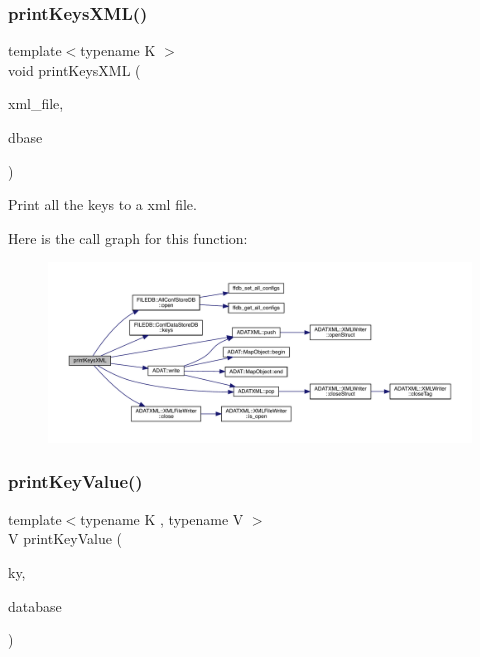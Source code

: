 \subsubsection{\texorpdfstring{printKeysXML()}{printKeysXML()}}
{\footnotesize\ttfamily template$<$typename K $>$ \\
void print\+Keys\+X\+ML (\begin{DoxyParamCaption}\item[{const string \&}]{xml\+\_\+file,  }\item[{const string \&}]{dbase }\end{DoxyParamCaption})}



Print all the keys to a xml file. 

Here is the call graph for this function\+:
\nopagebreak
\begin{figure}[H]
\begin{center}
\leavevmode
\includegraphics[width=350pt]{d4/d74/adat-devel_2main_2dbutil_2dbgraph__convert_8cc_a44428d59560cb466420c5c0ca60315e5_cgraph}
\end{center}
\end{figure}
\mbox{\label{adat-devel_2main_2dbutil_2dbgraph__convert_8cc_a1c5a310406bc62a92190de39689f1005}} 
\subsubsection{\texorpdfstring{printKeyValue()}{printKeyValue()}}
{\footnotesize\ttfamily template$<$typename K , typename V $>$ \\
V print\+Key\+Value (\begin{DoxyParamCaption}\item[{const K \&}]{ky,  }\item[{\mbox{\hyperlink{classFILEDB_1_1AllConfStoreDB}{All\+Conf\+Store\+DB}}$<$ \mbox{\hyperlink{classADATIO_1_1SerialDBKey}{Serial\+D\+B\+Key}}$<$ K $>$, \mbox{\hyperlink{classADATIO_1_1SerialDBData}{Serial\+D\+B\+Data}}$<$ typename \mbox{\hyperlink{structENSEM_1_1EnsemScalar}{Ensem\+Scalar}}$<$ V $>$\+::Type\+\_\+t $>$ $>$ \&}]{database }\end{DoxyParamCaption})}



